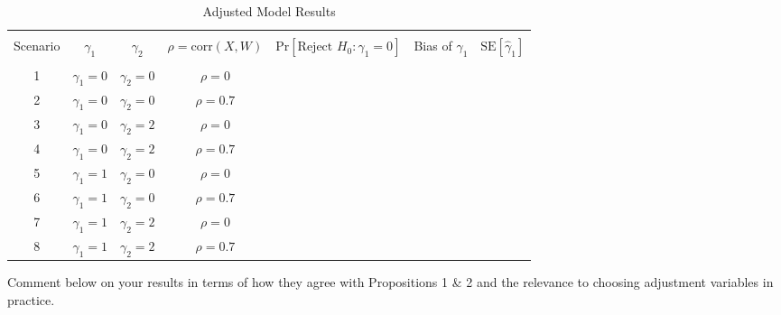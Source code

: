 \documentclass{article}
\begin{document}
\begin{table}[H]
\caption{Adjusted Model Results}
\begin{tabular}{ccccccc}
\hline \\ 
Scenario & $\gamma_1$ & $\gamma_2$ & $\rho = \text{corr}(X, W)$ & $\text{Pr}[\text{Reject } H_0: \gamma_1 = 0]$ & Bias of $\hat{\gamma}_1$ & $\text{SE}[\hat{\gamma}_1]$ \\[10pt]
\hline \\
1 & $\gamma_1 = 0$ & $\gamma_2 = 0$ & $\rho = 0$ & & & \\[10pt]
2 & $\gamma_1 = 0$ & $\gamma_2 = 0$ & $\rho = 0.7$ & & & \\[10pt]
3 & $\gamma_1 = 0$ & $\gamma_2 = 2$ & $\rho = 0$ & & & \\[10pt]
4 & $\gamma_1 = 0$ & $\gamma_2 = 2$ & $\rho = 0.7$ & & & \\[10pt]
5 & $\gamma_1 = 1$ & $\gamma_2 = 0$ & $\rho = 0$ & & & \\[10pt]
6 & $\gamma_1 = 1$ & $\gamma_2 = 0$ & $\rho = 0.7$ & & & \\[10pt]
7 & $\gamma_1 = 1$ & $\gamma_2 = 2$ & $\rho = 0$ & & & \\[10pt]
8 & $\gamma_1 = 1$ & $\gamma_2 = 2$ & $\rho = 0.7$ & & & \\[10pt]
\hline
\end{tabular}
\end{table}

\newpage

Comment below on your results in terms of how they agree with Propositions 1 \& 2 and the relevance to choosing adjustment variables in practice.
\end{document}
